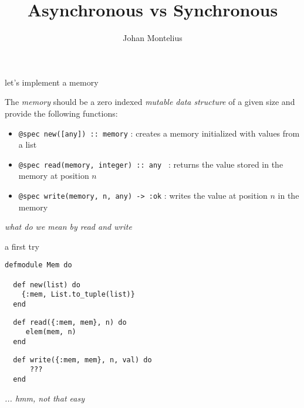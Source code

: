

\title[ID1019 Asynchronous]{Asynchronous vs Synchronous}


\author{Johan Montelius}
\date{\semester}



\begin{frame}
\titlepage
\end{frame}

\begin{frame}{let's implement a memory}

  The {\em memory} should be a zero indexed {\em mutable data
    structure} of a given size and provide the following functions:

\pause\vspace{20pt}

\begin{itemize}
 \item {\tt @spec new([any]) :: memory} : creates a memory initialized with values from a list \pause
 \item {\tt @spec read(memory, integer) :: any } : returns the value stored in the memory at position $n$ 
 \item {\tt @spec write(memory, n, any) -> :ok} : writes the value at position $n$ in the memory 
\end{itemize}

\pause\vspace{20pt}
{\em what do we mean by read and write}

\end{frame}

\begin{frame}[fragile]{a first try}

\begin{verbatim}
defmodule Mem do

  def new(list) do
    {:mem, List.to_tuple(list)}
  end
\end{verbatim} \pause
\begin{verbatim}
  def read({:mem, mem}, n) do
     elem(mem, n)
  end
\end{verbatim} \pause
\begin{verbatim}
  def write({:mem, mem}, n, val) do
      ???
  end 
\end{verbatim}

\pause\vspace{20pt}
{\em ... hmm, not that easy}

\end{frame}

